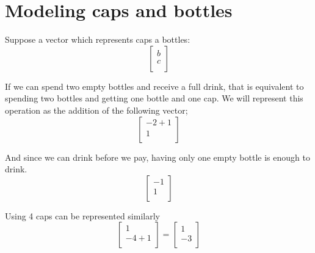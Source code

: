 \documentclass[letterpaper, 12pt]{article}
\begin{document}
\section{Modeling caps and bottles}
Suppose a vector which represents caps a bottles:
\[
    \begin{bmatrix}
        b\\
        c\\
    \end{bmatrix}
\]
\par If we can spend two empty bottles and receive a full drink, that is equivalent to spending two bottles and getting one bottle and one cap.
We will represent this operation as the addition of the following vector;
\[
    \begin{bmatrix}
        -2 + 1\\
        1\\
    \end{bmatrix}
\]
\par And since we can drink before we pay, having only one empty bottle is enough to drink.
\[
    \begin{bmatrix}
        -1\\
        1\\
    \end{bmatrix}
\]
\par Using 4 caps can be represented similarly
\[
    \begin{bmatrix}
        1\\
        -4 + 1\\
    \end{bmatrix}
    =
    \begin{bmatrix}
        1\\
        -3\\
    \end{bmatrix}
\]
\end{document}

